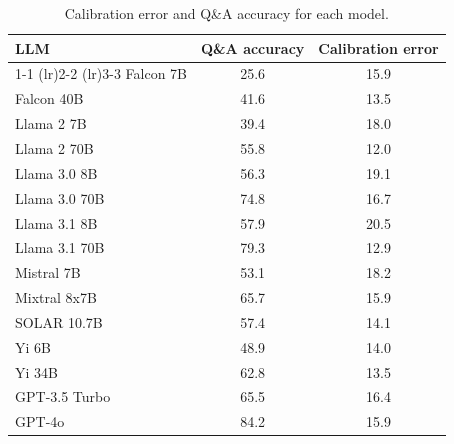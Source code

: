 \begin{table}[h]
\caption{Calibration error and Q\&A accuracy for each model.}
\label{tab:calibration_mmlu_prob_max}
\centering
\begin{tabular}{lcc}
\toprule
LLM & Q\&A accuracy & Calibration error \\ 
\cmidrule(lr){1-1} \cmidrule(lr){2-2} \cmidrule(lr){3-3}
Falcon 7B & 25.6 & 15.9\\
Falcon 40B & 41.6 & 13.5\\
Llama 2 7B & 39.4 & 18.0\\
Llama 2 70B & 55.8 & 12.0\\
Llama 3.0 8B & 56.3 & 19.1\\
Llama 3.0 70B & 74.8 & 16.7\\
Llama 3.1 8B & 57.9 & 20.5\\
Llama 3.1 70B & 79.3 & 12.9\\
Mistral 7B & 53.1 & 18.2\\
Mixtral 8x7B & 65.7 & 15.9\\
SOLAR 10.7B & 57.4 & 14.1\\
Yi 6B & 48.9 & 14.0\\
Yi 34B & 62.8 & 13.5\\
GPT-3.5 Turbo & 65.5 & 16.4\\
GPT-4o & 84.2 & 15.9\\
\bottomrule
\end{tabular}
\end{table}
